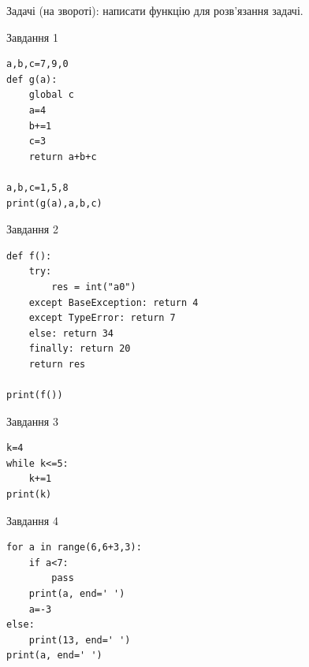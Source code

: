 \documentclass[12pt, ukrainian]{article}
\begin{document}
{{{{{{{{{{Задачі (на звороті): написати функцію для розв'язання задачі.

\vspace{5mm} \begin{minipage}[t]{8.5cm}
               
{\begin{center}Завдання {1}\end{center}}
\vspace{-6mm}

\begin{verbatim}
a,b,c=7,9,0
def g(a):
    global c
    a=4
    b+=1
    c=3
    return a+b+c

a,b,c=1,5,8
print(g(a),a,b,c)
\end{verbatim}


\vspace{5mm}
               
{\begin{center}Завдання {2}\end{center}}
\vspace{-6mm}

\begin{verbatim}
def f():
    try:
        res = int("a0")
    except BaseException: return 4
    except TypeError: return 7
    else: return 34
    finally: return 20
    return res

print(f())
\end{verbatim}


\vspace{5mm}
               
{\begin{center}Завдання {3}\end{center}}
\vspace{-6mm}

\begin{verbatim}
k=4
while k<=5:
    k+=1
print(k)
\end{verbatim}


\end{minipage}
\vline \hspace{6mm}
\begin{minipage}[t]{10.7cm}
               
{\begin{center}Завдання {4}\end{center}}
\vspace{-6mm}

\begin{verbatim}
for a in range(6,6+3,3):
    if a<7:
        pass
    print(a, end=' ')
    a=-3
else:
    print(13, end=' ')
print(a, end=' ')
\end{verbatim}



\end{minipage}}}}}}}}}}}
\end{document}
